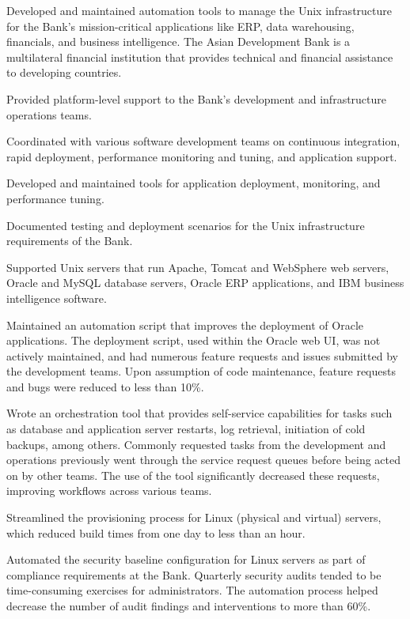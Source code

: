 \documentclass[10pt, a4paper, final]{article}
\begin{document}
\begin{section}
\begin{subsection}
    Developed and maintained automation tools to manage the Unix infrastructure for the Bank's mission-critical applications like ERP, data warehousing, financials, and business intelligence. The Asian Development Bank is a multilateral financial institution that provides technical and financial assistance to developing countries.
    \vspace{1em}
    \begin{compactitem}
      \item Provided platform-level support to the Bank's development and infrastructure operations teams.
      \item Coordinated with various software development teams on continuous integration, rapid deployment, performance monitoring and tuning, and application support.
      \item Developed and maintained tools for application deployment, monitoring, and performance tuning.
      \item Documented testing and deployment scenarios for the Unix infrastructure requirements of the Bank.
      \item Supported Unix servers that run Apache, Tomcat and WebSphere web servers, Oracle and MySQL database servers, Oracle ERP applications, and IBM business intelligence software.
      \item Maintained an automation script that improves the deployment of Oracle applications. The deployment script, used within the Oracle web UI, was not actively maintained, and had numerous feature requests and issues submitted by the development teams. Upon assumption of code maintenance, feature requests and bugs were reduced to less than 10\%.
      \item Wrote an orchestration tool that provides self-service capabilities for tasks such as database and application server restarts, log retrieval, initiation of cold backups, among others. Commonly requested tasks from the development and operations previously went through the service request queues before being acted on by other teams. The use of the tool significantly decreased these requests, improving workflows across various teams.
      \item Streamlined the provisioning process for Linux (physical and virtual) servers, which reduced build times from one day to less than an hour.
      \item Automated the security baseline configuration for Linux servers as part of compliance requirements at the Bank. Quarterly security audits tended to be time-consuming exercises for administrators. The automation process helped decrease the number of audit findings and interventions to more than 60\%.

\end{compactitem}
\end{subsection}
\end{section}
\end{document}

